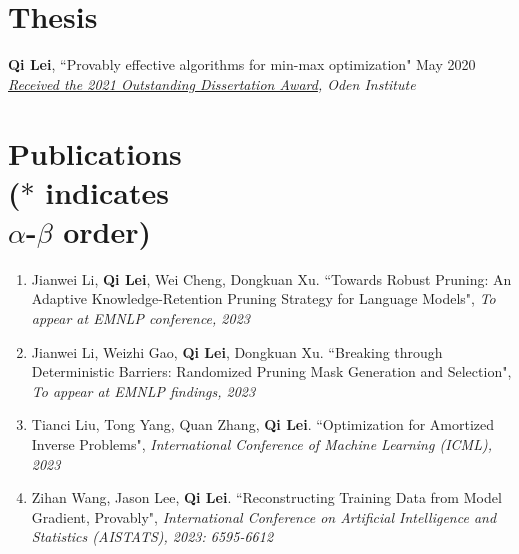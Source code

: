 \documentclass[margin, 10pt]{res} %
\begin{document}
\begin{resume}


\section{Thesis} 
\textbf{Qi Lei}, ``Provably effective algorithms for min-max optimization" \hfill{May 2020} \\ 
\textit{\href{https://www.oden.utexas.edu/news-and-events/news/Oden-Institute-Outstanding-Dissertation-Award-Winner-2021/}{Received the 2021 Outstanding Dissertation Award}, Oden Institute}

\newpage
\section{Publications\\
	\vspace{4pt}
{\footnotesize ($*$ indicates\\ $\alpha$-$\beta$ order) }}
\begin{enumerate}
\item{Jianwei Li, \textbf{Qi Lei}, Wei Cheng, Dongkuan Xu. ``Towards Robust Pruning: An Adaptive Knowledge-Retention Pruning Strategy for Language Models", \textit{To appear at EMNLP conference, 2023}}

\item{Jianwei Li, Weizhi Gao, \textbf{Qi Lei}, Dongkuan Xu. ``Breaking through Deterministic Barriers: Randomized Pruning Mask Generation and Selection", \textit{To appear at EMNLP findings, 2023}}
	
\item{Tianci Liu, Tong Yang, Quan Zhang, \textbf{Qi Lei}. ``Optimization for Amortized Inverse Problems", \textit{International Conference of Machine Learning (ICML), 2023}}
	
\item{Zihan Wang, Jason Lee, \textbf{Qi Lei}. ``Reconstructing Training Data from Model Gradient, Provably", \textit{International Conference on
		Artificial Intelligence and Statistics (AISTATS), 2023: 6595-6612}}
	

\end{enumerate}
\end{resume}
\end{document}
